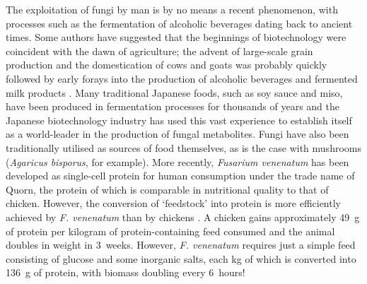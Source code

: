 The exploitation of fungi by man is by no means a recent phenomenon, with processes such as the fermentation of alcoholic beverages dating back to ancient times. Some authors have suggested that the beginnings of biotechnology were coincident with the dawn of agriculture; the advent of large-scale grain production and the domestication of cows and goats was probably quickly followed by early forays into the production of alcoholic beverages and fermented milk products \cite{enari1999}. Many traditional Japanese foods, such as soy sauce and miso, have been produced in fermentation processes for thousands of years \cite{gomi2008} and the Japanese biotechnology industry has used this vast experience to establish itself as a world-leader in the production of fungal metabolites. Fungi have also been traditionally utilised as sources of food themselves, as is the case with mushrooms (\emph{Agaricus bisporus}, for example). More recently, \emph{Fusarium venenatum} has been developed as single-cell protein for human consumption under the trade name of Quorn\texttrademark, the protein of which is comparable in nutritional quality to that of chicken. However, the conversion of \lq feedstock' into protein is more efficiently achieved by \emph{F. venenatum} than by chickens \cite{glazer2007}. A chicken gains approximately 49~g of protein per kilogram of protein-containing feed consumed and the animal doubles in weight in 3~weeks. However, \emph{F. venenatum} requires just a simple feed consisting of glucose and some inorganic salts, each kg of which is converted into 136~g of protein, with biomass doubling every 6~hours!

